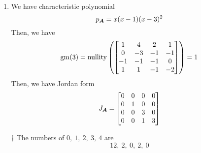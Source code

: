 \documentclass[a4paper,12pt]{article}
\begin{document}
\begin{enumerate}
	\item We have characteristic polynomial \begin{equation}
		p_{\boldsymbol{A}} = x(x - 1)(x - 3)^2
	\end{equation} Then, we have \begin{equation}
		\operatorname{gm}(3) = \operatorname{nullity}\left(\begin{bmatrix}
			1 & 4 & 2 & 1 \\
			0 & -3 & -1 & -1 \\
			-1 & -1 & -1 & 0 \\
			1 & 1 & -1 & -2
		\end{bmatrix}\right) = 1
	\end{equation} Then, we have Jordan form \begin{equation}
		\textit{J}_{\boldsymbol{A}} = \begin{bmatrix}
			0 & 0 & 0 & 0 \\
			0 & 1 & 0 & 0 \\
			0 & 0 & 3 & 0 \\
			0 & 0 & 1 & 3
		\end{bmatrix}
	\end{equation}
	\begin{answer}{$\dag$} The numbers of $0, \ 1, \ 2, \ 3, \ 4$ are \begin{equation}
			12, \ 2, \ 0, \ 2, \ 0
		\end{equation}
	\end{answer}
\end{enumerate}

\end{document}
